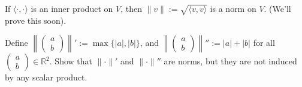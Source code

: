 \begin{claim*}
    If $\langle \cdot, \cdot \rangle$ is an inner product on $V$, then $\|v\| := \sqrt{\langle v, v \rangle}$ is a norm on $V$. (We'll prove this soon).
\end{claim*}

\begin{exercise}
    \label{exc:non_inner_product_norms}
    Define $\left\| \left(\begin{smallmatrix} a \\ b \end{smallmatrix}\right) \right\|' := \max\{|a|, |b|\}$, and $\left\| \left(\begin{smallmatrix} a \\ b \end{smallmatrix}\right) \right\|'' := |a| + |b|$ for all $\left(\begin{smallmatrix} a \\ b \end{smallmatrix}\right) \in \mathbb{R}^2$. Show that $\| \cdot \|'$ and $\| \cdot \|''$ are norms, but they are not induced by any scalar product. 
    
\end{exercise}

